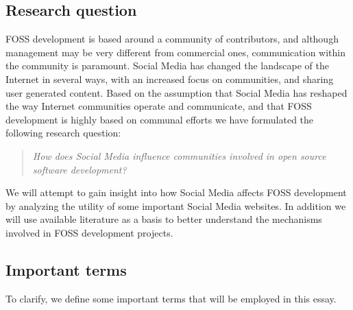 \documentclass[a4paper,11pt]{article} %
\begin{document}
\subsection{Research question}

FOSS development is based around a community of
contributors, and although management may be very different from commercial
ones, communication within the community is paramount. Social Media has
changed the landscape of the Internet in several ways, with an increased
focus on communities, and sharing user generated content\cite{Kaplan201059}.
Based on the assumption that Social Media has reshaped the way Internet communities
operate and communicate, and that FOSS development is highly based on communal efforts
we have formulated the following research question:
\begin{quote}
  \textit{How does Social Media influence communities involved in open source
    software development?}
\end{quote}

We will attempt to gain insight into how Social Media affects FOSS development
by analyzing the utility of some important Social Media websites. In addition
we will use available literature as a basis to better understand the mechanisms
involved in FOSS development projects. 


\subsection{Important terms}

To clarify, we define some important terms that will be employed in this essay.
\end{document}
